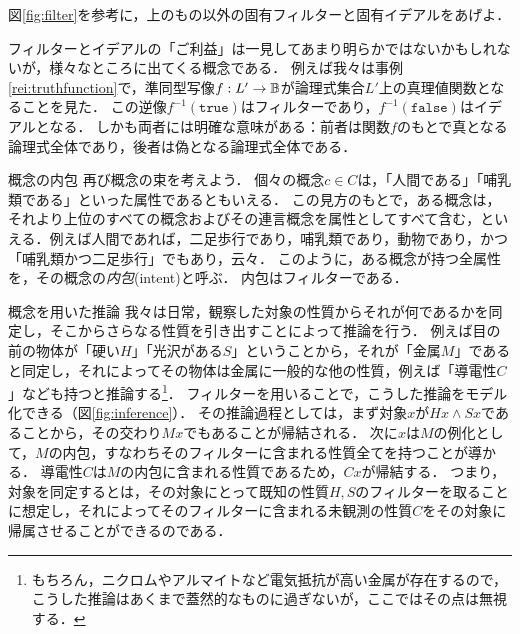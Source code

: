 \documentclass[11pt,a4paper, dvipdfmx]{jsarticle}
\begin{document}
\begin{renshu}{}{}
図\ref{fig:filter}を参考に，上のもの以外の固有フィルターと固有イデアルをあげよ．
\end{renshu}

フィルターとイデアルの「ご利益」は一見してあまり明らかではないかもしれないが，様々なところに出てくる概念である．
例えば我々は事例\ref{rei:truthfunction}で，準同型写像$f:L' \to \mathbb{B}$が論理式集合$L'$上の真理値関数となることを見た．
この逆像$f^{-1}(\texttt{true})$はフィルターであり，$f^{-1}(\texttt{false})$はイデアルとなる．
しかも両者には明確な意味がある：前者は関数$f$のもとで真となる論理式全体であり，後者は偽となる論理式全体である．

\begin{rei}{概念の内包}{}
再び概念の束を考えよう．
個々の概念$c \in C$は，「人間である」「哺乳類である」といった属性であるともいえる．
この見方のもとで，ある概念は，それより上位のすべての概念およびその連言概念を属性としてすべて含む，といえる．例えば人間であれば，二足歩行であり，哺乳類であり，動物であり，かつ「哺乳類かつ二足歩行」でもあり，云々．
このように，ある概念が持つ全属性を，その概念の\emph{内包}(intent)と呼ぶ．
内包はフィルターである．
\end{rei}

\begin{rei}{概念を用いた推論}{}
我々は日常，観察した対象の性質からそれが何であるかを同定し，そこからさらなる性質を引き出すことによって推論を行う．
例えば目の前の物体が「硬い$H$」「光沢がある$S$」ということから，それが「金属$M$」であると同定し，それによってその物体は金属に一般的な他の性質，例えば「導電性$C$」なども持つと推論する\footnote{もちろん，ニクロムやアルマイトなど電気抵抗が高い金属が存在するので，こうした推論はあくまで蓋然的なものに過ぎないが，ここではその点は無視する．}．
フィルターを用いることで，こうした推論をモデル化できる（図\ref{fig:inference}）．
その推論過程としては，まず対象$x$が$Hx \wedge Sx$であることから，その交わり$Mx$でもあることが帰結される．
次に$x$は$M$の例化として，$M$の内包，すなわちそのフィルターに含まれる性質全てを持つことが導かる．
導電性$C$は$M$の内包に含まれる性質であるため，$Cx$が帰結する．
つまり，対象を同定するとは，その対象にとって既知の性質$H, S$のフィルターを取ることに想定し，それによってそのフィルターに含まれる未観測の性質$C$をその対象に帰属させることができるのである．
\end{rei}
\end{document}
